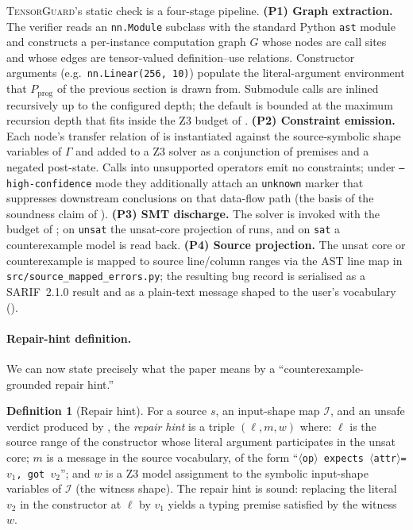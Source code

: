 \documentclass{article}
\theoremstyle{plain}
\theoremstyle{definition}
\newtheorem{definition}[theorem]{Definition}
\newcommand{\TensorGuard}{\textsc{TensorGuard}}
\newcommand{\nnmodule}{\texttt{nn.Module}}
\newcommand{\code}[1]{\texttt{\small #1}}
\begin{document}
\TensorGuard{}'s static check is a four-stage pipeline.
\textbf{(P1) Graph extraction.}  The verifier reads an
\nnmodule{} subclass with the standard Python \code{ast} module
and constructs a per-instance computation graph $G$ whose nodes
are call sites and whose edges are tensor-valued definition--use
relations.  Constructor arguments (e.g.\ \code{nn.Linear(256,
10)}) populate the literal-argument environment that
$P_\text{prog}$ of the previous section is drawn from.  Submodule
calls are inlined recursively up to the configured depth; the
default is bounded at the maximum recursion depth that fits inside
the Z3 budget of .
\textbf{(P2) Constraint emission.}  Each node's transfer relation
of  is instantiated against the source-symbolic
shape variables of $\Gamma$ and added to a Z3 solver as a
conjunction of premises and a negated post-state.  Calls into
unsupported operators emit no constraints; under
\code{--high-confidence} mode they additionally attach an
\code{unknown} marker that suppresses downstream conclusions on
that data-flow path (the basis of the soundness claim of
).
\textbf{(P3) SMT discharge.}  The solver is invoked with the
budget of ; on \code{unsat} the unsat-core
projection of  runs, and on \code{sat} a
counterexample model is read back.
\textbf{(P4) Source projection.}  The unsat core or counterexample
is mapped to source line/column ranges via the AST line map in
\code{src/source\_mapped\_errors.py}; the resulting bug record is
serialised as a SARIF~2.1.0 result and as a plain-text message
shaped to the user's vocabulary ().

\paragraph{Repair-hint definition.}
We can now state precisely what the paper means by a
``counterexample-grounded repair hint.''

\begin{definition}[Repair hint]
\label{def:repairhint}
For a source $s$, an input-shape map $\mathcal{I}$, and an unsafe
verdict produced by , the \emph{repair hint} is a
triple $(\ell, m, w)$ where:
$\ell$ is the source range of the constructor whose literal
argument participates in the unsat core;
$m$ is a message in the source vocabulary, of the form
``\code{$\langle$op$\rangle$ expects $\langle$attr$\rangle$=$v_1$,
got $v_2$}'';
and $w$ is a Z3 model assignment to the symbolic input-shape
variables of $\mathcal{I}$ (the witness shape).  The repair hint
is sound: replacing the literal $v_2$ in the constructor at $\ell$
by $v_1$ yields a typing premise satisfied by the witness $w$.
\end{definition}
\end{document}
